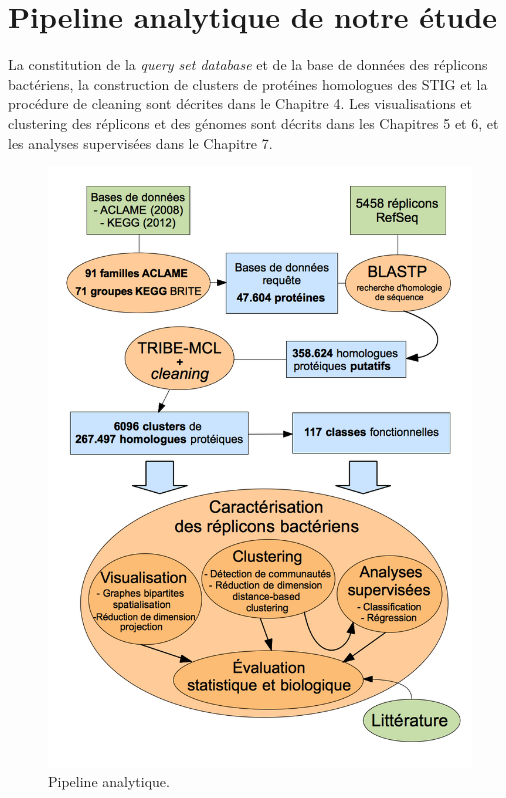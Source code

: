 \section{Pipeline analytique de notre étude}\label{analyseintro}

La constitution de la \textit{query set database} et de la base de données des réplicons bactériens, la construction de clusters de protéines homologues des STIG et la procédure de cleaning sont décrites dans le Chapitre 4. Les visualisations et clustering des réplicons et des génomes sont décrits dans les Chapitres 5 et 6, et les analyses supervisées dans le Chapitre 7. 
\newpage
\begin{figure}
\begin{center}
\includegraphics[width=\textwidth]{./img/workflow3.png}
\caption[Pipeline analytique]{Pipeline analytique.}
\end{center}
\end{figure}
